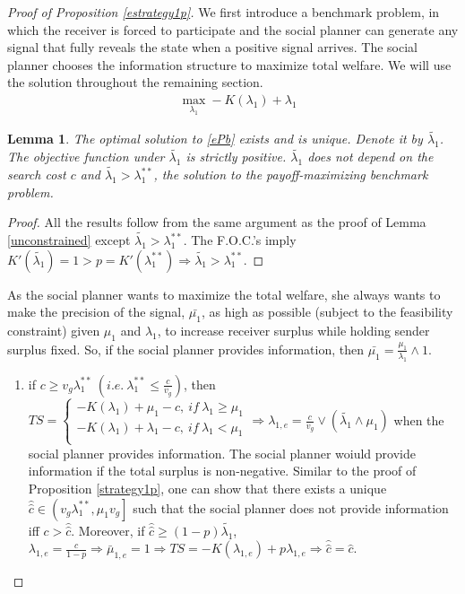 \documentclass[11pt]{extarticle}
\newtheorem{lemma}{Lemma}
\newcommand{\ra}{\Rightarrow}
\newcommand{\m}{\wedge}
\newcommand{\M}{\vee}
\begin{document}
\begin{proof}[Proof of Proposition \ref{estrategy1p}]
	We first introduce a benchmark problem, in which the receiver is forced to participate and the social planner can generate any signal that fully reveals the state when a positive signal arrives. The social planner chooses the information structure to maximize total welfare. We will use the solution throughout the remaining section.
	\begin{align}\tag{$E_b$} \label{ePb}
	& \max\limits_{\lambda_1} -K(\lambda_1) + \lambda_1\nonumber
	\end{align}
	
	\begin{lemma}\label{eunconstrained}
		The optimal solution to \eqref{ePb} exists and is unique. Denote it by $\tilde{\lambda_1}$. The objective function under $\tilde{\lambda_1}$ is strictly positive. $\tilde{\lambda_1}$ does not depend on the search cost $c$ and $\tilde{\lambda_1} > \lambda_1^{**}$, the solution to the payoff-maximizing benchmark problem.
	\end{lemma}
	\begin{proof}
		All the results follow from the same argument as the proof of Lemma \ref{unconstrained} except $\tilde{\lambda_1} > \lambda_1^{**}$. The F.O.C.'s imply $K'(\tilde{\lambda_1}) = 1 > p = K'(\lambda_1^{**}) \ra \tilde{\lambda_1} > \lambda_1^{**}$. 
	\end{proof}

	As the social planner wants to maximize the total welfare, she always wants to make the precision of the signal, $\bar{\mu_1}$, as high as possible (subject to the feasibility constraint) given $\mu_1$ and $\lambda_1$, to increase receiver surplus while holding sender surplus fixed. So, if the social planner provides information, then $\bar{\mu_1} = \frac{\mu_1}{\lambda_1} \m 1$.
	\begin{enumerate}
		\item if $c \geq v_g \lambda_1^{**}~(i.e.~ \lambda_1^{**} \leq \frac{c}{v_g})$, then $TS =  \begin{cases}
		-K(\lambda_1)+\mu_1-c,~if~\lambda_1\geq \mu_1\\
		-K(\lambda_1)+\lambda_1-c,~if~\lambda_1< \mu_1\\
		\end{cases}\ra \lambda_{1,e} = \frac{c}{v_g}\M(\tilde{\lambda_1} \m \mu_1)$ when the social planner provides information. The social planner woiuld provide information if the total surplus is non-negative. Similar to the proof of Proposition \ref{strategy1p}, one can show that there exists a unique $\widehat{\widehat{c}} \in \left(v_g\lambda_1^{**}, \mu_1v_g\right]$ such that the social planner does not provide information iff $c > \widehat{\widehat{c}}$. Moreover,  if $\widehat{\widehat{c}} \geq (1-p)\tilde{\lambda_1}$, $\lambda_{1,e} = \frac{c}{1-p} \ra \bar{\mu}_{1,e} = 1 \ra TS = -K(\lambda_{1,e}) + p \lambda_{1,e} \ra \widehat{\widehat{c}} = \widehat{c}$.
		

\end{enumerate}
\end{proof}
\end{document}
